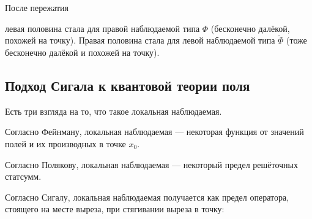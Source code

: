 \documentclass[11pt]{article}
\theoremstyle{remark}
\theoremstyle{definition}
\begin{document}
После пережатия


\begin{center}
\end{center}

левая половина стала для правой наблюдаемой типа $\Phi$ (бесконечно далёкой, похожей на точку). Правая половина стала для левой наблюдаемой типа $\tilde \Phi$ (тоже бесконечно далёкой и похожей на точку).


\subsection{Подход Сигала к квантовой теории поля}

Есть три взгляда на то, что такое локальная наблюдаемая.

Согласно Фейнману, локальная наблюдаемая --- некоторая функция от значений полей и их производных в точке $x_0$.

Согласно Полякову, локальная наблюдаемая --- некоторый предел решёточных статсумм.

Согласно Сигалу, локальная наблюдаемая получается как предел оператора, стоящего на месте выреза, при стягивании выреза в точку:
\end{document}
